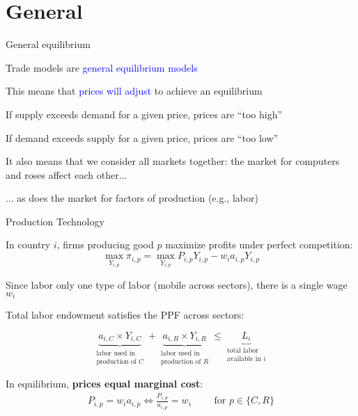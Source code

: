 \documentclass[notes,11pt, aspectratio=169, xcolor=table]{beamer}
\newcommand{\blue}[1]{\textcolor{blue}{#1}}
\newenvironment{wideitemize}{\itemize\addtolength{\itemsep}{10pt}}{\enditemize}
\begin{document}
\section{General}

\begin{frame}{General equilibrium}
\begin{wideitemize}
        \item Trade models are \blue{general equilibrium models}
        \item<2-> This means that \blue{prices will adjust} to achieve an equilibrium
        \item<3-> If supply exceeds demand for a given price, prices are ``too high''
        \item<4-> If demand exceeds supply for a given price,  prices are ``too low''
        \item<5-> It also means that we consider all markets together: the market for computers and roses affect each other...
        \item<6-> ... as does the market for factors of production (e.g., labor)
        \end{wideitemize}
\end{frame}

\begin{frame}{Production Technology}
\begin{wideitemize}
        \item In country $i$, firms producing good $p$ maximize profits under perfect competition:
        \begin{equation*}
            \max_{Y_{i,p}} \pi_{i,p} = \max_{Y_{i,p}} P_{i,p}Y_{i,p} - w_i a_{i,p} Y_{i,p} 
        \end{equation*}
        \item Since labor only one type of labor (mobile across sectors), there is a single wage $w_i$
        \item<3-> Total labor endowment satisfies the PPF across sectors:
        
        \begin{equation*}
            \underbrace{a_{i,C} \times Y_{i,C}}_{\substack{\text{labor used in} \\ \text{production of } C}} + \underbrace{a_{i,R} \times Y_{i,R}}_{\substack{\text{labor used in} \\ \text{production of } R}} \le \underbrace{L_i}_{\substack{\text{total labor} \\ \text{available in } i}}
        \end{equation*}

        \item<4-> In equilibrium, \textbf{prices equal marginal cost}:
        \begin{eqnarray*}
            P_{i,p} = w_i a_{i,p} \iff \frac{P_{i,p}}{a_{i,p}} = w_i  \qquad \text{ for } p \in\{C,R\}
        \end{eqnarray*}
    \end{wideitemize}
\end{frame}
\end{document}
